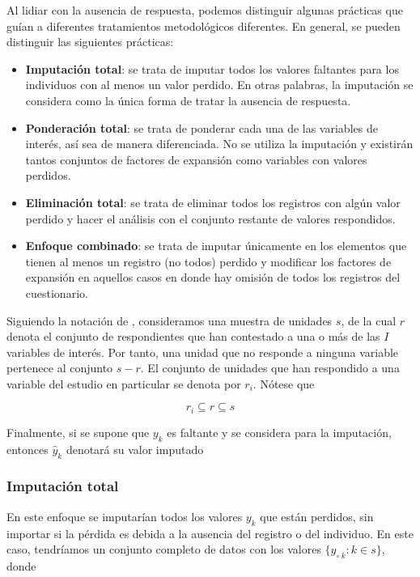 \documentclass[
  10pt,
  spanish,
]{book}
\providecommand{\tightlist}{%
  \setlength{\itemsep}{0pt}\setlength{\parskip}{0pt}}
\begin{document}
Al lidiar con la ausencia de respuesta, podemos distinguir algunas prácticas que guían a diferentes tratamientos metodológicos diferentes. En general, se pueden distinguir las siguientes prácticas:

\begin{itemize}
\tightlist
\item
  \textbf{Imputación total}: se trata de imputar todos los valores faltantes para los individuos con al menos un valor perdido. En otras palabras, la imputación se considera como la única forma de tratar la ausencia de respuesta.
\item
  \textbf{Ponderación total}: se trata de ponderar cada una de las variables de interés, así sea de manera diferenciada. No se utiliza la imputación y existirán tantos conjuntos de factores de expansión como variables con valores perdidos.
\item
  \textbf{Eliminación total}: se trata de eliminar todos los registros con algún valor perdido y hacer el análisis con el conjunto restante de valores respondidos.
\item
  \textbf{Enfoque combinado}: se trata de imputar únicamente en los elementos que tienen al menos un registro (no todos) perdido y modificar los factores de expansión en aquellos casos en donde hay omisión de todos los registros del cuestionario.
\end{itemize}

Siguiendo la notación de \citet{Sarndal_Lundstrom_2006}, consideramos una muestra de unidades \(s\), de la cual \(r\) denota el conjunto de respondientes que han contestado a una o más de las \(I\) variables de interés. Por tanto, una unidad que no responde a ninguna variable pertenece al conjunto \(s-r\). El conjunto de unidades que han respondido a una variable del estudio en particular se denota por \(r_i\). Nótese que

\[
r_i\subseteq r \subseteq s
\]

Finalmente, si se supone que \(y_k\) es faltante y se considera para la imputación, entonces \(\hat{y}_k\) denotará su valor imputado

\hypertarget{imputaciuxf3n-total}{%
\subsubsection*{Imputación total}\label{imputaciuxf3n-total}}

En este enfoque se imputarían todos los valores \(y_k\) que están perdidos, sin importar si la pérdida es debida a la ausencia del registro o del individuo. En este caso, tendríamos un conjunto completo de datos con los valores \(\{y_{\circ \  k}: k\in s\}\), donde
\end{document}
